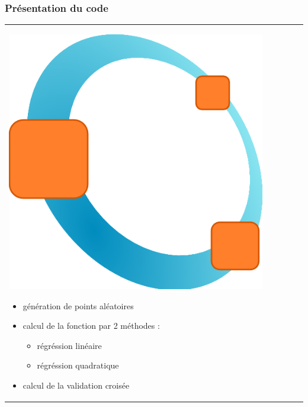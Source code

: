 \documentclass[handout]{beamer}
\begin{document}
	\begin{frame}
	\frametitle{Présentation du code}
	\begin{tabular}{l l}
		\begin{minipage}{0.4\textwidth}
			\begin{center}
				\includegraphics[width=0.9\textwidth]{images/octave.png}
			\end{center}
		\end{minipage}

		\begin{minipage}{0.6\textwidth}
			\begin{itemize}
				\item génération de points aléatoires
				\item calcul de la fonction par 2 méthodes : 
					\begin{itemize}
						\item régréssion linéaire
						\item régréssion quadratique
					\end{itemize}
				\item calcul de la validation croisée
			\end{itemize}
		\end{minipage}

	\end{tabular}
	\end{frame}

\end{document}
